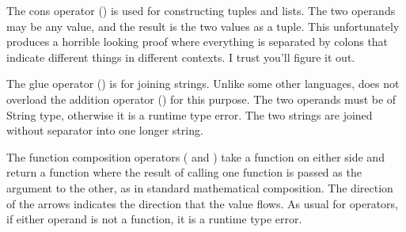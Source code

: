 \begin{prooftree}
\end{prooftree}

The cons operator (\op{:}) is used for constructing tuples and lists. The
two operands may be any value, and the result is the two values as a tuple.
This unfortunately produces a horrible looking proof where everything is
separated by colons that indicate different things in different contexts.
I trust you'll figure it out.

\begin{prooftree}
\end{prooftree}

The glue operator (\op{<>}) is for joining strings. Unlike some other languages,
\Trilogy{} does not overload the addition operator (\op{+}) for this purpose.
The two operands must be of String type, otherwise it is a runtime type error.
The two strings are joined without separator into one longer string.

\begin{prooftree}
\end{prooftree}

The function composition operators (\op{<<} and \op{>>}) take a function on either
side and return a function where the result of calling one function is passed as the
argument to the other, as in standard mathematical composition. The direction of
the arrows indicates the direction that the value flows. As usual for operators,
if either operand is not a function, it is a runtime type error.

\begin{prooftree}
\end{prooftree}

\begin{prooftree}
\end{prooftree}

